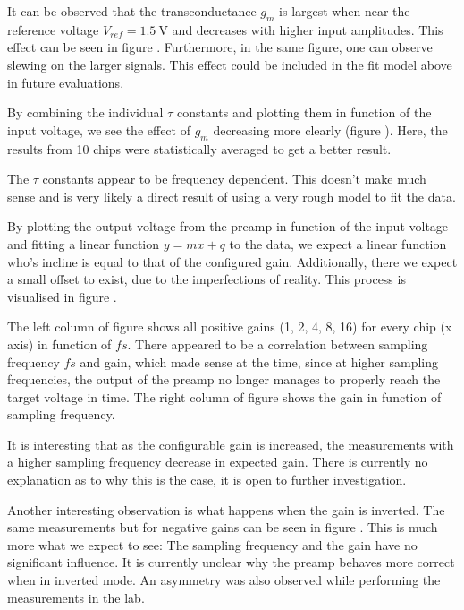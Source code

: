 It can be observed that the transconductance $g_m$ is largest  when  near  the
reference voltage $V_{ref}=\SI{1.5}{\volt}$ and  decreases  with  higher input
amplitudes. This effect can be seen in  figure 
. 
Furthermore, in the same figure, one can
observe slewing on  the  larger  signals. This effect could be included in the
fit model above in future evaluations.

By combining the individual $\tau$ constants and  plotting them in function of
the input voltage, we see the  effect of $g_m$ decreasing more clearly (figure
).  Here,  the  results from 10 chips were
statistically averaged to get a better result.

The $\tau$ constants  appear to be frequency dependent. This doesn't make much
sense and is very likely a direct  result  of  using a very rough model to fit
the data.

By  plotting  the output voltage from the preamp  in  function  of  the  input
voltage and fitting a linear function $y=mx+q$ to the data, we expect a linear
function who's  incline is equal to that of the configured gain. Additionally,
there  we expect a small offset to exist, due to the imperfections of reality.
This  process  is  visualised  in  figure .

The  left  column of figure   shows  all  positive
gains (1, 2, 4, 8, 16) for every chip (x  axis)  in  function  of  $fs$. There
appeared to be a  correlation  between sampling frequency $fs$ and gain, which
made  sense  at the time, since at higher sampling frequencies, the output  of
the preamp no longer manages to properly reach the target voltage in time. The
right column of figure  shows  the  gain in function
of  sampling  frequency.

It is interesting that as the configurable gain is increased, the measurements
with a higher sampling frequency decrease in expected gain. There is currently
no  explanation  as  to  why  this  is  the  case,  it   is  open  to  further
investigation.

Another interesting observation is what happens when the gain is inverted. The
same  measurements  but   for   negative   gains   can   be   seen  in  figure
. This is much more  what  we  expect  to see: The
sampling frequency and the gain have no significant influence. It is currently
unclear  why  the  preamp  behaves  more correct when  in  inverted  mode.  An
asymmetry  was  also observed while performing the measurements  in  the  lab.


